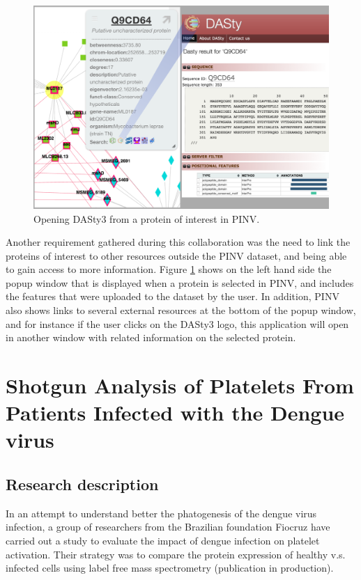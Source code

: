 \begin{figure}
\centering
\includegraphics[width=5in]{figures/pinv2dasty.png}
\caption[Opening DASty3 from a protein of interest in PINV.]{Opening DASty3 from a protein of interest in PINV.
\label{fig:pinv2dasty}}
\end{figure}

Another requirement gathered during this collaboration was the need to link the proteins of interest to other resources outside the PINV dataset, and being able to gain access to more information. Figure \ref{fig:pinv2dasty} shows on the left hand side the popup window that is displayed when a protein is selected in PINV, and includes the features that were uploaded to the dataset by the user. In addition, PINV also shows links to several external resources at the bottom of the popup window, and for instance if the user clicks on the DASty3 logo, this application will open in another window with related information on the selected protein.


\section{Shotgun Analysis of Platelets From Patients Infected with the Dengue virus}
\label{sec:dengue}
\subsection{Research description}
In an attempt to understand better the phatogenesis of the dengue virus infection, a group of researchers from the Brazilian foundation Fiocruz have carried out a study to evaluate the impact of dengue infection on platelet activation. Their strategy was to compare the protein expression of healthy v.s. infected cells using label free mass spectrometry (publication in production).

